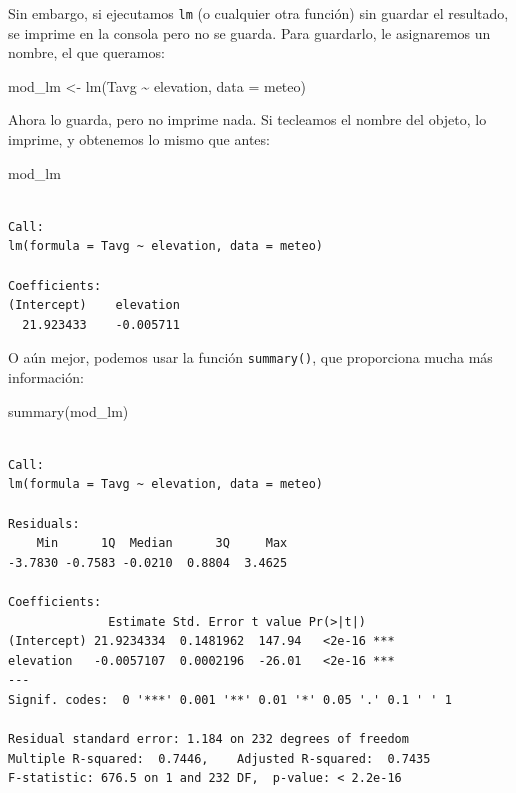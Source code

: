 \documentclass[
  letterpaper,
  DIV=11,
  numbers=noendperiod]{scrreprt}
\newenvironment{Shaded}{\begin{snugshade}}{\end{snugshade}}
\newcommand{\AttributeTok}[1]{\textcolor[rgb]{0.40,0.45,0.13}{#1}}
\newcommand{\FunctionTok}[1]{\textcolor[rgb]{0.28,0.35,0.67}{#1}}
\newcommand{\NormalTok}[1]{\textcolor[rgb]{0.00,0.23,0.31}{#1}}
\newcommand{\OtherTok}[1]{\textcolor[rgb]{0.00,0.23,0.31}{#1}}
\newcommand{\SpecialCharTok}[1]{\textcolor[rgb]{0.37,0.37,0.37}{#1}}
\begin{document}
Sin embargo, si ejecutamos \texttt{lm} (o cualquier otra función) sin
guardar el resultado, se imprime en la consola pero no se guarda. Para
guardarlo, le asignaremos un nombre, el que queramos:

\begin{Shaded}
\begin{Highlighting}[]
\NormalTok{mod\_lm }\OtherTok{\textless{}{-}} \FunctionTok{lm}\NormalTok{(Tavg }\SpecialCharTok{\textasciitilde{}}\NormalTok{ elevation, }\AttributeTok{data =}\NormalTok{ meteo)}
\end{Highlighting}
\end{Shaded}

Ahora lo guarda, pero no imprime nada. Si tecleamos el nombre del
objeto, lo imprime, y obtenemos lo mismo que antes:

\begin{Shaded}
\begin{Highlighting}[]
\NormalTok{mod\_lm}
\end{Highlighting}
\end{Shaded}

\begin{verbatim}

Call:
lm(formula = Tavg ~ elevation, data = meteo)

Coefficients:
(Intercept)    elevation  
  21.923433    -0.005711  
\end{verbatim}

O aún mejor, podemos usar la función \texttt{summary()}, que proporciona
mucha más información:

\begin{Shaded}
\begin{Highlighting}[]
\FunctionTok{summary}\NormalTok{(mod\_lm)}
\end{Highlighting}
\end{Shaded}

\begin{verbatim}

Call:
lm(formula = Tavg ~ elevation, data = meteo)

Residuals:
    Min      1Q  Median      3Q     Max 
-3.7830 -0.7583 -0.0210  0.8804  3.4625 

Coefficients:
              Estimate Std. Error t value Pr(>|t|)    
(Intercept) 21.9234334  0.1481962  147.94   <2e-16 ***
elevation   -0.0057107  0.0002196  -26.01   <2e-16 ***
---
Signif. codes:  0 '***' 0.001 '**' 0.01 '*' 0.05 '.' 0.1 ' ' 1

Residual standard error: 1.184 on 232 degrees of freedom
Multiple R-squared:  0.7446,    Adjusted R-squared:  0.7435 
F-statistic: 676.5 on 1 and 232 DF,  p-value: < 2.2e-16
\end{verbatim}
\end{document}
